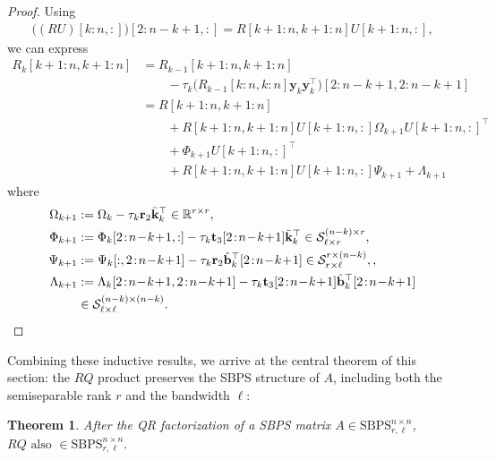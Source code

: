 \documentclass[a4paper,fleqn]{cas-sc}
\newtheorem{mytheorem}{Theorem}
\def\calS{{\mathcal S}}
\def\bfy{{\mathbf y}}
\def\bfb{{\mathbf b}}
\def\bft{{\mathbf t}}
\def\bfr{{\mathbf r}}
\def\bfk{{\mathbf k}}
\begin{document}
\begin{proof}
    Using 
    \begin{align*}
        \big((RU)[k:n,:]\big)[2:n-k+1,:] = R[k+1:n,k+1:n]U[k+1:n,:],
    \end{align*}
    we can express
    \begin{align*}
        R_k[k\!+\!1\!:\!n,k\!+\!1\!:\!n]&=R_{k-1}[k\!+\!1\!:\!n,k\!+\!1\!:\!n] \\
        &\qquad -\tau_k\big(R_{k-1}[k\!:\!n,k\!:\!n]\bfy_k\bfy_k^\top)[2\!:\!n\!-\!k\!+\!1,2\!:\!n\!-\!k\!+\!1]\\
        &=
        R[k\!+\!1\!:\!n,k\!+\!1\!:\!n]\\
        &\qquad+R[k\!+\!1\!:\!n,k\!+\!1\!:\!n]U[k\!+\!1\!:\!n,:]\Omega_{k+1}U[k\!+\!1\!:\!n,:]^\top\\
        &\qquad
        +\Phi_{k+1}U[k\!+\!1\!:\!n,:]^\top\\
        &\qquad +R[k\!+\!1\!:\!n,k\!+\!1\!:\!n]U[k\!+\!1\!:\!n,:]\Psi_{k+1}+\Lambda_{k+1}
    \end{align*}
    where
    \begin{align}
        \Omega_{k+1}&:=\Omega_k-\tau_k\bfr_2\bar \bfk_k^\top \in \mathbb R^{r\times r}, \label{eq:rq_submatrix_1}\\
        \Phi_{k+1}&:=\Phi_{k}[2\!:\!n\!-\!k\!+\!1,:]-\tau_k\bft_3[2\!:\!n\!-\!k\!+\!1]\bar \bfk_k^\top \in \calS^{(n-k)\times r}_{\ell \times r}, \label{eq:rq_submatrix_2}\\
        \Psi_{k+1}&:=\Psi_{k}[:,2\!:\!n\!-\!k\!+\!1]-\tau_k\bfr_2\hat \bfb_k^\top [2\!:\!n\!-\!k\!+\!1] \in \calS^{r\times(n-k)}_{r\times \ell}, \label{eq:rq_submatrix_3}, \\
        \Lambda_{k+1}&:=\Lambda_k[2\!:\!n\!-\!k\!+\!1,2\!:\!n\!-\!k\!+\!1]-\tau_k\bft_3[2\!:\!n\!-\!k\!+\!1]\hat \bfb_k^\top[2\!:\!n\!-\!k\!+\!1] \label{eq:rq_submatrix_4}\\ &\in \calS^{(n-k)\times(n-k)}_{\ell \times \ell}.  \notag
    \end{align}
\end{proof}

Combining these inductive results, we arrive at the central theorem of this section: the $RQ$ product preserves the SBPS structure of $A$, including both the semiseparable rank $r$ and the bandwidth $\ell$:

\begin{mytheorem}\label{thm:structure_rq}
    After the QR factorization of a SBPS matrix $A\in {\mathrm{SBPS}}_{r,\ell}^{n \times n}$,
$
RQ \text{ also }\in {\mathrm{SBPS}}_{r,\ell}^{n \times n}.
$

\end{mytheorem}
\end{document}

